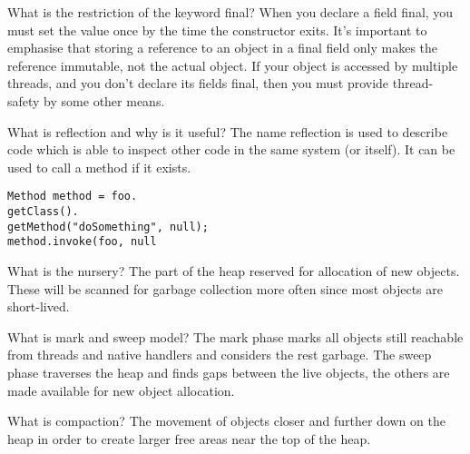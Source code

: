 \begin{flashcard}[Concurrency]{What is the restriction of the keyword final?}
When you declare a field final, you must set the value once by the time the constructor exits. It's important to emphasise that storing a reference to an object in a final field only makes the reference immutable, not the actual object. If your object is accessed by multiple threads, and you don't declare its fields final, then you must provide thread-safety by some other means.
\end{flashcard}

\begin{flashcard}[Lang]{What is reflection and why is it useful?}
The name reflection is used to describe code which is able to inspect other code in the same system (or itself).
It can be used to call a method if it exists.
\begin{lstlisting}[frame=single]
Method method = foo.
getClass().
getMethod("doSomething", null);
method.invoke(foo, null
\end{lstlisting}
\end{flashcard}

\begin{flashcard}[Memory]{What is the nursery?}
The part of the heap reserved for allocation of new objects. These will be scanned for garbage collection more often since most objects are short-lived.
\end{flashcard}

\begin{flashcard}[Memory]{What is mark and sweep model?}
The mark phase marks all objects still reachable from threads and native handlers and considers the rest garbage. The sweep phase traverses the heap and finds gaps between the live objects, the others are made available for new object allocation.
\end{flashcard}

\begin{flashcard}[Memory]{What is compaction?}
The movement of objects closer and further down on the heap in order to create larger free areas near the top of the heap.
\end{flashcard}

